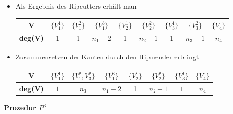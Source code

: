 \documentclass[12pt,titlepage]{article}
\begin{document}
\begin{itemize}
\item Als Ergebnis des Ripcutters erhält man
\begin{center}
\begin{tabular}{|c|c|c|c|c|c|c|c|c|}
\hline
  \textbf{V} & $\{V_1^1\}$ & $\{V_1^2\}$ & $\{V_1^3\}$ & $\{V_2^1\}$ & $\{V_2^2\} $ & $\{V_3^1\}$ & $\{V_3^2\}$& $\{V_4\}$\\ 
  \hline
   \textbf{deg(V)} & 1 & 1 & $n_1-2$ &1& $n_2-1$ & 1 & $n_3-1$ & $n_4$ \\  
   \hline
 \end{tabular}
 \end{center}
\item Zusammensetzen der Kanten durch den Ripmender erbringt
\begin{center}
\begin{tabular}{|c|c|c|c|c|c|c|c|}
\hline
  \textbf{V} & $\{V_1^1\}$ & $\{V_1^2,V_3^2\}$ & $\{V_1^3\}$ & $\{V_2^1\}$ & $\{V_2^2\} $ & $\{V_3^1\}$ & $\{V_4\}$\\ 
  \hline
   \textbf{deg(V)} & $1$ & $n_3$ & $n_1-2$ &1& $n_2-1$ & $1$ & $n_4$ \\  
   \hline
 \end{tabular}
 \end{center}
 \end{itemize}
\textbf{Prozedur $P^3$}
\end{document}
